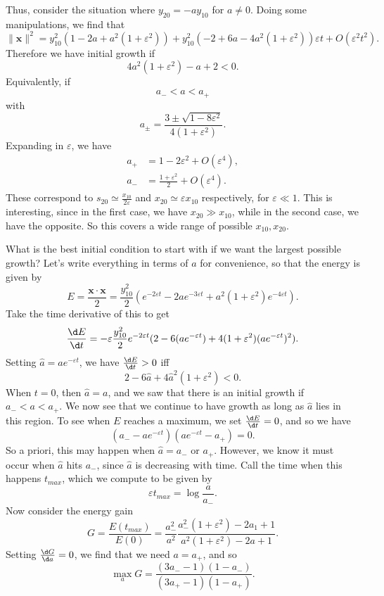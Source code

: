 \documentclass[a4paper]{article}
\begin{document}
Thus, consider the situation where $y_{20} = - a y_{10}$ for $a \not =0$. Doing some manipulations, we find that
\[
  \|\mathbf{x}\|^2 = y_{10}^2 (1 - 2a + a^2 (1 + \varepsilon^2)) + y_{10}^2 (-2 + 6a - 4a^2(1 + \varepsilon^2))\varepsilon t + O(\varepsilon^2 t^2).
\]
Therefore we have initial growth if
\[
  4a^2 (1 + \varepsilon^2) - a + 2 < 0.
\]
Equivalently, if
\[
  a_- < a < a_+
\]
with
\[
  a_{\pm} = \frac{3 \pm \sqrt{1 - 8\varepsilon^2}}{4(1 + \varepsilon^2)}.
\]
Expanding in $\varepsilon$, we have
\begin{align*}
  a_+ &= 1 - 2 \varepsilon^2 + O(\varepsilon^4),\\
  a_- &= \frac{1 + \varepsilon^2}{2} + O(\varepsilon^4).
\end{align*}
These correspond to $s_{20} \simeq \frac{x_{10}}{2\varepsilon}$ and $x_{20} \simeq \varepsilon x_{10}$ respectively, for $\varepsilon \ll 1$. This is interesting, since in the first case, we have $x_{20} \gg x_{10}$, while in the second case, we have the opposite. So this covers a wide range of possible $x_{10}, x_{20}$.

What is the best initial condition to start with if we want the largest possible growth? Let's write everything in terms of $a$ for convenience, so that the energy is given by
\[
  E = \frac{\mathbf{x} \cdot \mathbf{x}}{2} = \frac{y_{10}^2}{2} (e^{-2\varepsilon t} - 2 a e^{-3 \varepsilon t} + a^2(1 + \varepsilon^2) e^{-4\varepsilon t}).
\]
Take the time derivative of this to get
\[
  \frac{\d E}{\d t} = - \varepsilon \frac{y_{10}^2}{2} e^{-2\varepsilon t} (2 - 6 (a e^{-\varepsilon t}) + 4 (1 + \varepsilon^2) (ae^{-\varepsilon t})^2).
\]
Setting $\hat{a} = ae^{-\varepsilon t}$, we have $\frac{\d E}{\d t} > 0$ iff
\[
  2 - 6 \hat{a} + 4 \hat{a}^2 (1 + \varepsilon^2) < 0.
\]
When $t = 0$, then $\hat{a} = a$, and we saw that there is an initial growth if $a_- < a < a_+$. We now see that we continue to have growth as long as $\hat{a}$ lies in this region. To see when $E$ reaches a maximum, we set $\frac{\d E}{\d t} = 0$, and so we have
\[
  (a_- - ae^{-\varepsilon t})(ae^{-\varepsilon t} - a_+) = 0.
\]
So a priori, this may happen when $\hat{a} = a_-$ or $a_+$. However, we know it must occur when $\hat{a}$ hits $a_-$, since $\hat{a}$ is decreasing with time. Call the time when this happens $t_{max}$, which we compute to be given by
\[
  \varepsilon t_{max} = \log \frac{a}{a_-}.
\]
Now consider the energy gain
\[
  G = \frac{E(t_{max})}{E(0)} = \frac{a_-^2}{a^2} \frac{a_-^2(1 + \varepsilon^2) - 2a_1 + 1}{a^2 (1 + \varepsilon^2) - 2a + 1}.
\]
Setting $\frac{\d G}{\d a} = 0$, we find that we need $a = a_+$, and so
\[
  \max_a G = \frac{(3a_- - 1)(1 - a_-)}{(3a_+ - 1)(1 - a_+)}.
\]
\end{document}
